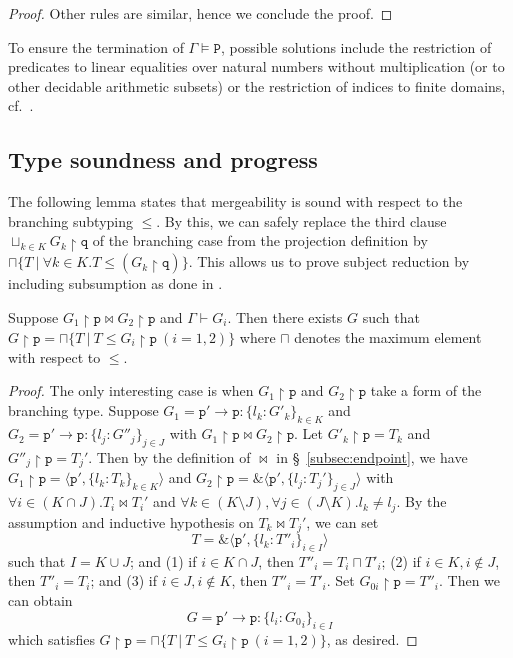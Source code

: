 \documentclass{LMCS}
\newcommand{\ptilde}[1]{{\ensuremath{#1}}}
\newcommand{\participant}[1]{\ensuremath{\mathtt{#1}}}
\newcommand{\q}{\ensuremath{\participant{q}}}
\newcommand{\p}{\ensuremath{\participant{p}}}
\newcommand{\indexed}[4]{\ensuremath{\{#1_#3 : #2_#3\}_{#3 \in #4}}}
\newcommand{\at}[1]{\ensuremath{\ptilde{#1}}}
\newcommand{\G}{\ensuremath{G}}
\newcommand{\TO}[2]{#1\to #2}
\newcommand{\qq}{\ensuremath{\at{\q}}}
\newcommand{\subT}{\ensuremath{\leq}}
\newcommand{\proj}[1]{\ensuremath{\upharpoonright #1}}
\newcommand{\PRED}{\ensuremath{\mathtt{P}}}
\newcommand{\proves}{\vdash}                        \newcommand{\judg}{{J}}
\newcommand{\mergeop}{\ensuremath{\bowtie}}
\begin{document}
\begin{proof}
Other rules are similar, hence we conclude the proof. 
\end{proof}
To ensure the termination of $\Gamma\models \PRED$, possible solutions include
the restriction of predicates to linear equalities over natural numbers without
multiplication (or to other decidable arithmetic subsets) or the restriction of
indices to finite domains, cf.~\cite{DBLP:conf/popl/XiP99}.



\subsection{Type soundness and progress}
\noindent 

\noindent The following lemma states that mergeability is sound 
with respect to the branching subtyping 
$\subT$. 
By this, we can safely replace the third clause 
$\sqcup_{k\in K}  \G_k\proj{\qq}$ of the branching case from the projection definition by 
$\sqcap \{T\ | \ \forall k\in K.T \subT (G_k\proj{\qq}) \}$.  
This allows us to prove subject reduction by including subsumption 
as done in \cite{CHY07}. 


\begin{lem}
\label{lem:mergeability}
Suppose $G_1\proj{\p} \mergeop G_2\proj{\p}$ and 
$\Gamma \proves G_i$. Then there exists $G$ such that 
$G\proj{\p}=\sqcap \{T\ | \ T \subT G_i\proj{\p} \ (i=1,2)\}$
where $\sqcap$ denotes the maximum element with respect to $\subT$. 
\end{lem}
\begin{proof}
The only interesting case is when $G_1\proj{\p}$ and $G_2\proj{\p}$ take 
a form of the branching type. Suppose 
$G_1 = \TO{\p'}{\p}\colon\! \indexed{l}{{\G'}}{k}{K}$
and 
$G_2 = \TO{\p'}{\p}\colon\! \indexed{l}{{\G''}}{j}{J}$
with $G_1\proj{\p} \mergeop G_2\proj{\p}$. 
Let $\G'_{k}\proj{\p}=T_{k}$ and 
$\G''_{j}\proj{\p}=T_{j}'$. 
Then by the definition of $\mergeop$ in \S~\ref{subsec:endpoint}, 
we have $G_1\proj{\p}= \langle\p',\{l_k:T_{k}\}_{k\in K}\rangle$ 
and
$G_2\proj{\p}=\&\langle\p',\{l_j:T_{j}'\}_{j\in J}\rangle$ 
with 
$\forall i\in (K \cap J). T_i\mergeop T_i'$ and
$\forall k\in (K \setminus J),\forall j\in (J \setminus K).l_k \not = l_j$. 
By the assumption and inductive hypothesis on $T_k\mergeop T_j'$, 
we can set 
\[
T=\&\langle\p',\{l_k:T''_{i}\}_{i\in I}\rangle
\] 
such that $I=K \cup J$; and (1) if $i\in K \cap J$, then  
$T''_{i}=T_{i}\sqcap T'_{i}$; (2) if $i\in K, i\not\in J$, then  
$T''_{i}=T_{i}$; and (3)
if $i\in J, i\not\in K$, then  
$T''_{i}=T'_{i}$. Set 
$G_{0i}\proj{\p}=T''_i$. Then we can obtain 
\[ 
G=\TO{\p'}{\p}\colon\! \indexed{l}{{\G_{0}}}{i}{I}
\]
which satisfies 
$G\proj{\p}=\sqcap \{T\ | \ T \subT G_i\proj{\p} \ (i=1,2)\}$, 
as desired. 
\end{proof}
\end{document}
